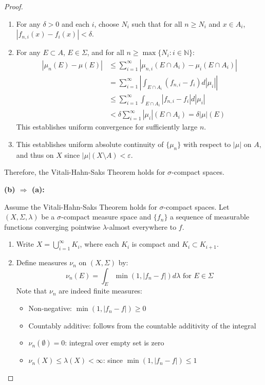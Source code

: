 \documentclass{article}
\begin{document}
\begin{proof}
\begin{enumerate}
    \item For any $\delta > 0$ and each $i$, choose $N_i$ such that for all $n \geq N_i$ and $x \in A_i$, $|f_{n,i}(x) - f_i(x)| < \delta$.
    
    \item For any $E \subset A$, $E \in \Sigma$, and for all $n \geq \max\{N_i : i \in \mathbb{N}\}$:
    \begin{align*}
    |\mu_n(E) - \mu(E)| &\leq \sum_{i=1}^{\infty} |\mu_{n,i}(E \cap A_i) - \mu_i(E \cap A_i)| \\
    &= \sum_{i=1}^{\infty} \left|\int_{E\cap A_i} (f_{n,i} - f_i) d|\mu_i|\right| \\
    &\leq \sum_{i=1}^{\infty} \int_{E\cap A_i} |f_{n,i} - f_i| d|\mu_i| \\
    &< \delta\sum_{i=1}^{\infty} |\mu_i|(E \cap A_i) = \delta|\mu|(E)
    \end{align*}
    This establishes uniform convergence for sufficiently large $n$.
    
    \item This establishes uniform absolute continuity of $\{\mu_n\}$ with respect to $|\mu|$ on $A$, and thus on $X$ since $|\mu|(X \setminus A) < \varepsilon$.
\end{enumerate}

Therefore, the Vitali-Hahn-Saks Theorem holds for $\sigma$-compact spaces.

\noindent\textbf{(b) $\Rightarrow$ (a):}

Assume the Vitali-Hahn-Saks Theorem holds for $\sigma$-compact spaces. Let $(X, \Sigma, \lambda)$ be a $\sigma$-compact measure space and $\{f_n\}$ a sequence of measurable functions converging pointwise $\lambda$-almost everywhere to $f$.

\begin{enumerate}
    \item Write $X = \bigcup_{i=1}^{\infty} K_i$, where each $K_i$ is compact and $K_i \subset K_{i+1}$.
    
    \item Define measures $\nu_n$ on $(X, \Sigma)$ by:
    \[\nu_n(E) = \int_E \min(1, |f_n - f|) d\lambda \text{ for } E \in \Sigma\]
    Note that $\nu_n$ are indeed finite measures:
    \begin{itemize}
        \item Non-negative: $\min(1, |f_n - f|) \geq 0$
        \item Countably additive: follows from the countable additivity of the integral
        \item $\nu_n(\emptyset) = 0$: integral over empty set is zero
        \item $\nu_n(X) \leq \lambda(X) < \infty$: since $\min(1, |f_n - f|) \leq 1$
    \end{itemize}
    

\end{enumerate}
\end{proof}
\end{document}
